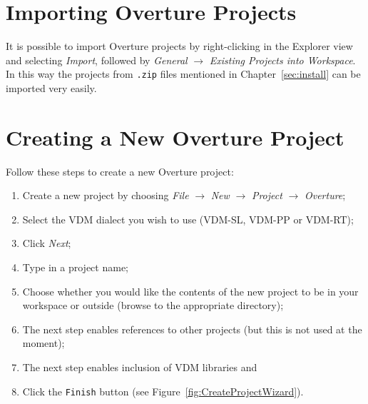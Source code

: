 \documentclass{overturerepchap}
\begin{document}
\section{Importing Overture Projects}\label{subsec:importproj}

It is possible to import Overture projects by
right-clicking in the Explorer view and selecting \emph{Import}, followed
by \emph{General} $\rightarrow$ \emph{Existing Projects into
  Workspace}.  In this way the projects from \texttt{.zip} files
mentioned in Chapter~\ref{sec:install} can be imported very
easily.

\section{Creating a New Overture Project}

Follow these steps to create a new Overture project:

\begin{enumerate}
	\item Create a new project by choosing \emph{File}
          $\rightarrow$ \emph{New} $\rightarrow$ \emph{Project}
          $\rightarrow$ \emph{Overture}; 
	\item Select the VDM dialect you wish to use (VDM-SL, VDM-PP
          or VDM-RT);
	\item Click \emph{Next};
         \item Type in a project name;
	\item Choose whether you would like the contents of the new
          project to be in your workspace or outside
          (browse to the appropriate directory); 
\item The next step enables references to other projects (but this is not used at the moment);
\item The next step enables inclusion of VDM libraries and
    \item Click	the \texttt{Finish} button (see Figure~\ref{fig:CreateProjectWizard}).
\end{enumerate}
\end{document}

